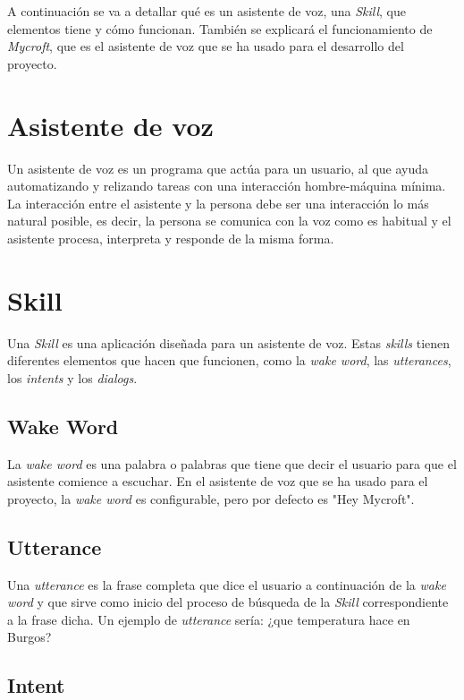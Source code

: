 
A continuación se va a detallar qué es un asistente de voz, una \textit{Skill}, que elementos tiene y cómo funcionan. También se explicará el funcionamiento de \textit{Mycroft}, que es el asistente de voz que se ha usado para el desarrollo del proyecto.

\section{Asistente de voz}

Un asistente de voz es un programa que actúa para un usuario, al que ayuda automatizando y relizando tareas con una interacción hombre-máquina mínima. La interacción entre el asistente y la persona debe ser una interacción lo más natural posible, es decir, la persona se comunica con la voz como es habitual y el asistente procesa, interpreta y responde de la misma forma.

\section{Skill}

Una \textit{Skill} es una aplicación diseñada para un asistente de voz. Estas \textit{skills} tienen diferentes elementos que hacen que funcionen, como la \textit{wake word}, las \textit{utterances}, los \textit{intents} y los \textit{dialogs}.

\subsection{Wake Word}

La \textit{wake word} es una palabra o palabras que tiene que decir el usuario para que el asistente comience a escuchar. En el asistente de voz que se ha usado para el proyecto, la \textit{wake word} es configurable, pero por defecto es "Hey Mycroft".

\subsection{Utterance}

Una \textit{utterance} es la frase completa que dice el usuario a continuación de la \textit{wake word} y que sirve como inicio del proceso de búsqueda de la \textit{Skill} correspondiente a la frase dicha. Un ejemplo de \textit{utterance} sería: ¿que temperatura hace en Burgos?

\subsection{Intent}

